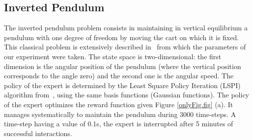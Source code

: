 \documentclass{article}
\begin{document}
\subsection{Inverted Pendulum}
%
%
The inverted pendulum problem consists in maintaining in vertical
equilibrium a pendulum with one degree of freedom by moving the cart
on which it is fixed. This classical problem is extensively
described in~\cite{lagoudakis2003least} from which the parameters of
our experiment were taken. The state space is two-dimensional: the
first dimension is the angular position of the pendulum (where the
vertical position corresponds to the angle zero) and the second one
is the angular speed. The policy of the expert is determined by the
Least Square Policy Iteration (LSPI) algorithm
from~\cite{lagoudakis2003least}, using the same basis functions
(Gaussian functions).
%
The policy of the expert optimizes the reward function given Figure
\ref{onlyFig.fig} (a). It manages systematically to maintain the
pendulum during 3000 time-steps. A time-step having a value of 0.1s,
the expert is interrupted after 5 minutes of successful
interactions.
%
%
\end{document}

